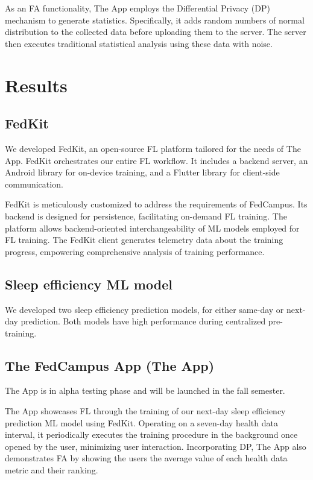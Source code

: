 \documentclass{article}
\begin{document}
\begin{multicols}{2}
As an FA functionality, The App employs the Differential Privacy (DP)
mechanism to generate statistics. Specifically, it adds random numbers
of normal distribution to the collected data before uploading them to
the server. The server then executes traditional statistical analysis
using these data with noise.

\section{Results}

\subsection{FedKit}

We developed FedKit, an open-source FL platform tailored for the needs
of The App. FedKit orchestrates our entire FL workflow. It includes a
backend server, an Android library for on-device training, and a Flutter
library for client-side communication.

FedKit is meticulously customized to address the requirements of
FedCampus. Its backend is designed for persistence, facilitating
on-demand FL training. The platform allows backend-oriented
interchangeability of ML models employed for FL training. The FedKit
client generates telemetry data about the training progress, empowering
comprehensive analysis of training performance.

\subsection{Sleep efficiency ML model}

We developed two sleep efficiency prediction models, for either same-day
or next-day prediction. Both models have high performance during
centralized pre-training.

\subsection{The FedCampus App (The App)}

The App is in alpha testing phase and will be launched in the fall
semester.

The App showcases FL through the training of our next-day sleep
efficiency prediction ML model using FedKit. Operating on a seven-day
health data interval, it periodically executes the training procedure in
the background once opened by the user, minimizing user interaction.
Incorporating DP, The App also demonstrates FA by showing the users the
average value of each health data metric and their ranking.


\end{multicols}
\end{document}
